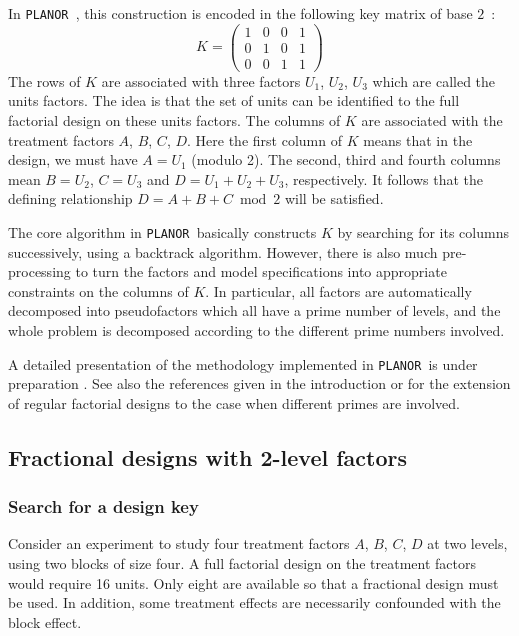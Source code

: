 \documentclass[a4paper]{article}
\newcommand{\PLANOR}{\texttt{PLANOR }}
\begin{document}
In \PLANOR, this construction is encoded in the following key matrix
of base $2$~:
\begin{equation*}
  K= 
  \left(
    \begin{array}{cccc}
      1&0&0&1\\
      0&1&0&1\\
      0&0&1&1
    \end{array}
  \right)
\end{equation*}
The rows of $K$ are associated with three factors $U_1$, $U_2$, $U_3$
which are called the units factors. The idea is that the set of units
can be identified to the full factorial design on these units
factors. The columns of $K$ are associated with the treatment factors
$A$, $B$, $C$, $D$. Here the first column of $K$ means that in the
design, we must have $A=U_1$ (modulo 2). The second, third and fourth
columns mean $B=U_2$, $C=U_3$ and $D=U_1+U_2+U_3$, respectively. It
follows that the defining relationship $D=A+B+C \bmod 2$ will be
satisfied.

The core algorithm in \PLANOR basically constructs $K$ by searching
for its columns successively, using a backtrack algorithm. However,
there is also much pre-processing to turn the factors and model
specifications into appropriate constraints on the columns of $K$. In
particular, all factors are automatically decomposed into
pseudofactors which all have a prime number of levels, and the whole
problem is decomposed according to the different prime numbers
involved.

A detailed presentation of the methodology implemented in \PLANOR is
under preparation \cite{kobbai12}. See also the references given in
the introduction or \cite{pisrog08} for the extension of regular
factorial designs to the case when different primes are involved.

\subsection{Fractional designs with 2-level factors}
\subsubsection{Search for a design key}
Consider an experiment to study four treatment factors $A$, $B$, $C$,
$D$ at two levels, using two blocks of size four. A full factorial
design on the treatment factors would require 16 units. Only eight are
available so that a fractional design must be used. In addition, some
treatment effects are necessarily confounded with the block effect.
\end{document}
